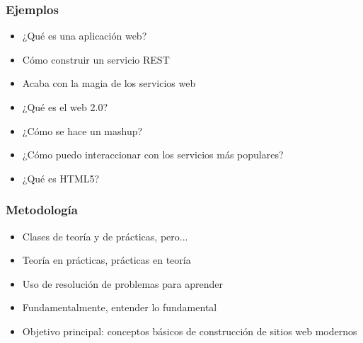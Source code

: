 
\begin{frame}
\frametitle{Ejemplos}

\vspace{1cm}

\begin{itemize}
\item ¿Qué es una aplicación web?
\item Cómo construir un servicio REST
\item Acaba con la magia de los servicios web
\item ¿Qué es el web 2.0?
\item ¿Cómo se hace un mashup?
\item ¿Cómo puedo interaccionar con los servicios más populares?
\item ¿Qué es HTML5?
\end{itemize}

\end{frame}


\begin{frame}
\frametitle{Metodología}

\vspace{1cm}

\begin{itemize}
\item Clases de teoría y de prácticas, pero...
\item Teoría en prácticas, prácticas en teoría
\item Uso de resolución de problemas para aprender
\item Fundamentalmente, entender lo fundamental
\item Objetivo principal: conceptos básicos de construcción de sitios
  web modernos
\end{itemize}

\end{frame}


